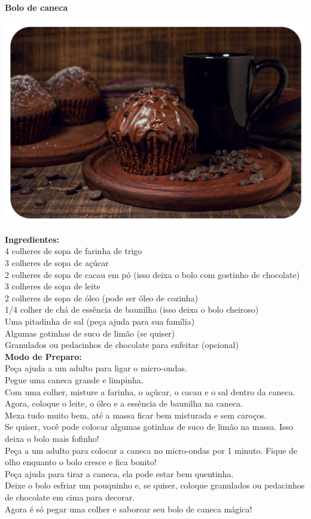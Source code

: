 \begin{myquote}
\begin{center}
\textbf{Bolo de caneca}

\includegraphics[width=.6\textwidth]{media/image188.png}
\end{center}

\textbf{Ingredientes:}\\
4 colheres de sopa de farinha de trigo\\
3 colheres de sopa de açúcar\\
2 colheres de sopa de cacau em pó (isso deixa o bolo com gostinho de chocolate)\\
3 colheres de sopa de leite\\
2 colheres de sopa de óleo (pode ser óleo de cozinha)\\
1/4 colher de chá de essência de baunilha (isso deixa o bolo cheiroso)\\
Uma pitadinha de sal (peça ajuda para sua família)\\
Algumas gotinhas de suco de limão (se quiser)\\
Granulados ou pedacinhos de chocolate para enfeitar (opcional)\\

\textbf{Modo de Preparo:}\\
Peça ajuda a um adulto para ligar o micro-ondas.\\
Pegue uma caneca grande e limpinha.\\
Com uma colher, misture a farinha, o açúcar, o cacau e o sal dentro da caneca.\\
Agora, coloque o leite, o óleo e a essência de baunilha na caneca.\\
Mexa tudo muito bem, até a massa ficar bem misturada e sem caroços.\\
Se quiser, você pode colocar algumas gotinhas de suco de limão na massa. Isso deixa o bolo mais fofinho!\\
Peça a um adulto para colocar a caneca no micro-ondas por 1 minuto. Fique de olho enquanto o bolo cresce e fica bonito!\\
Peça ajuda para tirar a caneca, ela pode estar bem quentinha.\\
Deixe o bolo esfriar um pouquinho e, se quiser, coloque granulados ou pedacinhos de chocolate em cima para decorar.\\
Agora é só pegar uma colher e saborear seu bolo de caneca mágica!
\end{myquote}

